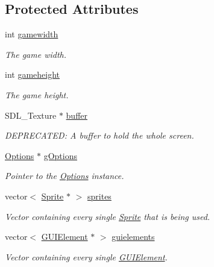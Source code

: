 \subsection*{Protected Attributes}
\begin{DoxyCompactItemize}
\item 
int \hyperlink{class_graphics_adf4a36eb3049ba3d07d79af2b4ac6399}{gamewidth}
\begin{DoxyCompactList}\small\item\em The game width. \end{DoxyCompactList}\item 
int \hyperlink{class_graphics_ac176bce8a1a8b73f6ed05e68410d9a14}{gameheight}
\begin{DoxyCompactList}\small\item\em The game height. \end{DoxyCompactList}\item 
S\-D\-L\-\_\-\-Texture $\ast$ \hyperlink{class_graphics_aa3ea5fd0f0a672850bb1352d5ca302f1}{buffer}
\begin{DoxyCompactList}\small\item\em D\-E\-P\-R\-E\-C\-A\-T\-E\-D\-: A buffer to hold the whole screen. \end{DoxyCompactList}\item 
\hyperlink{class_options}{Options} $\ast$ \hyperlink{class_graphics_aafe6ff08323ccbe6478472e3ec30715c}{g\-Options}
\begin{DoxyCompactList}\small\item\em Pointer to the \hyperlink{class_options}{Options} instance. \end{DoxyCompactList}\item 
vector$<$ \hyperlink{class_sprite}{Sprite} $\ast$ $>$ \hyperlink{class_graphics_ad01e5a24a1ce34c64f6dd7de4f85fc8b}{sprites}
\begin{DoxyCompactList}\small\item\em Vector containing every single \hyperlink{class_sprite}{Sprite} that is being used. \end{DoxyCompactList}\item 
vector$<$ \hyperlink{class_g_u_i_element}{G\-U\-I\-Element} $\ast$ $>$ \hyperlink{class_graphics_ac4ea71ee39d3cbc7b3fc14bf89fa400f}{guielements}
\begin{DoxyCompactList}\small\item\em Vector containing every single \hyperlink{class_g_u_i_element}{G\-U\-I\-Element}. \end{DoxyCompactList}\end{DoxyCompactItemize}


